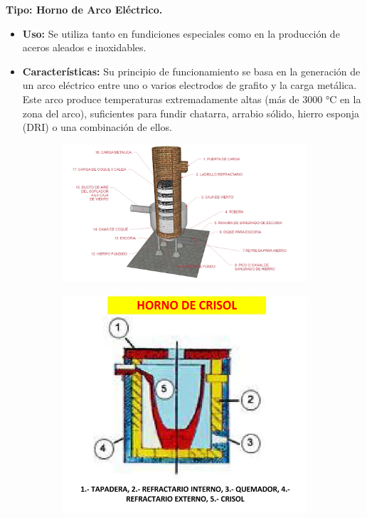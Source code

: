 \documentclass[12pt,a4paper]{article}
\begin{document}
\textbf{Tipo: Horno de Arco Eléctrico.}

\begin{itemize}
    \item \textbf{Uso:} Se utiliza tanto en fundiciones especiales como en la producción de aceros aleados e inoxidables.
    \item \textbf{Características:} Su principio de funcionamiento se basa en la generación de un arco eléctrico entre uno o varios electrodos de grafito y la carga metálica. Este arco produce temperaturas extremadamente altas (más de 3000 °C en la zona del arco), suficientes para fundir chatarra, arrabio sólido, hierro esponja (DRI) o una combinación de ellos.
\end{itemize}

\begin{figure}[h!]
    \centering
    \begin{subfigure}{0.9\textwidth}
        \centering
        \includegraphics[width=\textwidth]{Inagenes para latex/cubilote.png}
        \label{cubilote}
    \end{subfigure}
    \begin{subfigure}{0.45\textwidth}
        \centering
        \includegraphics[width=\textwidth]{Inagenes para latex/crisol.png}

\end{subfigure}
\end{figure}
\end{document}

